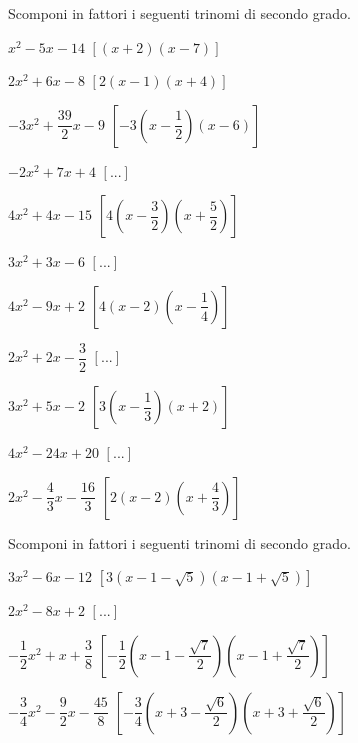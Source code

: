 \begin{esercizio}[*]
 \label{ese:3.84}
Scomponi in fattori i seguenti trinomi di secondo grado.
\begin{htmulticols}{2}
\begin{enumeratea}
\item\(x^{2}-5 x-14\) \hfill\(\left[(x + 2) (x-7)\right]\)
\item\(2 x^{2} + 6 x-8\) \hfill\(\left[2 (x-1) (x + 4)\right]\)
\item\(- 3 x^{2} + \dfrac{39}{2} x-9\) 
 \hfill\(\left[-3 \left(x-\dfrac{1}{2} \right) (x-6)\right]\)
\item\(- 2 x^{2} + 7 x + 4\) \hfill\(\left[...\right]\)
\item\(4 x^{2} + 4 x-15\) 
 \hfill\(\left[4 \left(x-\dfrac{3}{2} \right) 
         \left(x + \dfrac{5}{2} \right)\right]\)
\item\(3 x^{2} + 3 x-6\) \hfill\(\left[...\right]\)
\item\(4 x^{2}-9 x + 2\) 
 \hfill\(\left[4 (x-2) \left(x-\dfrac{1}{4} \right)\right]\)
\item\(2 x^{2} + 2 x - \dfrac{3}{2}\) \hfill\(\left[...\right]\)
\item\(3 x^{2} + 5 x - 2\) 
 \hfill\(\left[3 \left(x-\dfrac{1}{3} \right) (x + 2)\right]\)
\item\(4 x^{2}-24 x + 20\) 
 \hfill\(\left[...\right]\)
\item\(2 x^{2}-\dfrac{4}{3} x - \dfrac{16}{3}\) 
 \hfill\(\left[2 (x-2) \left(x + \dfrac{4}{3} \right)\right]\)
\end{enumeratea}
\end{htmulticols}
\end{esercizio}

\begin{esercizio}[*]
 \label{ese:3.87}
Scomponi in fattori i seguenti trinomi di secondo grado.
\begin{enumeratea}
\item\(3 x^{2}-6 x-12\) 
 \hfill\(\left[3 \left(x-1-\sqrt{5} \right) 
         \left(x-1 + \sqrt{5} \right)\right]\)
\item\(2 x^{2}-8 x + 2\) 
 \hfill\(\left[...\right]\)
\item\(- \dfrac{1}{2} x^{2} + x + \dfrac{3}{8}\) 
 \hfill\(\left[- \dfrac{1}{2} \left(x-1-\dfrac{\sqrt{7}}{2} \right) 
         \left(x- 1 + \dfrac{\sqrt{7}}{2} \right)\right]\)
\item\(- \dfrac{3}{4} x^{2}-\dfrac{9}{2} x - \dfrac{45}{8}\) 
 \hfill\(\left[- \dfrac{3}{4} \left(x + 3-\dfrac{\sqrt{6}}{2} \right) 
         \left(x+ 3 + \dfrac{\sqrt{6}}{2} \right)\right]\)
\end{enumeratea}
\end{esercizio}

